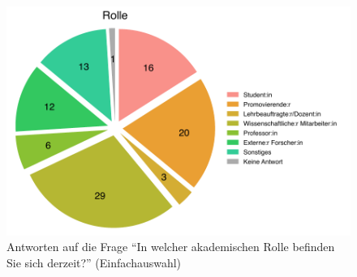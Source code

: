 \documentclass{scrartcl}
\begin{document}
\begin{figure}[ht]
   \includegraphics[width=1\textwidth]{rolle.pdf}
   \caption{Antworten auf die Frage \enquote{In welcher akademischen Rolle befinden Sie sich derzeit?} (Einfachauswahl)}
   \label{fig:rolle}
\end{figure}
\end{document}

